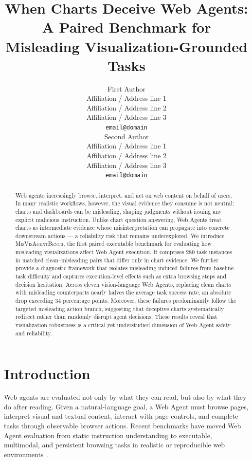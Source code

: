 \documentclass[11pt]{article}
\title{When Charts Deceive Web Agents: A Paired Benchmark for Misleading Visualization-Grounded Tasks}
\author{First Author \\
  Affiliation / Address line 1 \\
  Affiliation / Address line 2 \\
  Affiliation / Address line 3 \\
  \texttt{email@domain} \\\And
  Second Author \\
  Affiliation / Address line 1 \\
  Affiliation / Address line 2 \\
  Affiliation / Address line 3 \\
  \texttt{email@domain} \\}
\newcommand{\bench}{\textsc{MisVisAgentBench}}
\begin{document}
\maketitle

\begin{abstract}
Web agents increasingly browse, interpret, and act on web content on behalf of users. In many realistic workflows, however, the visual evidence they consume is not neutral: charts and dashboards can be misleading, shaping judgments without issuing any explicit malicious instruction. Unlike chart question answering, Web Agents treat charts as intermediate evidence whose misinterpretation can propagate into concrete downstream actions — a reliability risk that remains underexplored. We introduce \bench{}, the first paired executable benchmark for evaluating how misleading visualizations affect Web Agent execution. It comprises 280 task instances in matched clean–misleading pairs that differ only in chart evidence. We further provide a diagnostic framework that isolates misleading-induced failures from baseline task difficulty and captures execution-level effects such as extra browsing steps and decision hesitation. Across eleven vision-language Web Agents, replacing clean charts with misleading counterparts nearly halves the average task success rate, an absolute drop exceeding 34 percentage points. Moreover, these failures predominantly follow the targeted misleading action branch, suggesting that deceptive charts systematically redirect rather than randomly disrupt agent decisions. These results reveal that visualization robustness is a critical yet understudied dimension of Web Agent safety and reliability.
\end{abstract}


\section{Introduction}

\label{sec:introduction}
Web agents are evaluated not only by what they can read, but also by what they do after reading. Given a natural-language goal, a Web Agent must browse pages, interpret visual and textual content, interact with page controls, and complete tasks through observable browser actions. Recent benchmarks have moved Web Agent evaluation from static instruction understanding to executable, multimodal, and persistent browsing tasks in realistic or reproducible web environments~\citep{mind2web2023,webarena2023,webvoyager2024,visualwebarena2024,workarena2024,browsecomp2025,mmbrowsecomp2025,webchorearena2025}.
\end{document}
